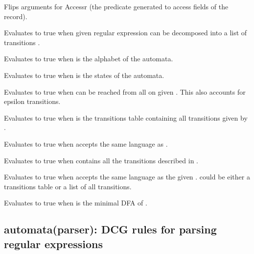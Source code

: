 \begin{description}
Flips arguments for Accessr (the predicate generated to access
fields of the record).

Evaluates to true when given regular expression  can be
decomposed into a list of transitions .

\begin{tags}
\end{tags}

Evaluates to true when  is the alphabet of the  automata.

Evaluates to true when  is the states of the  automata.

Evaluates to true when  can be reached from all 
on given . This also accounts for epsilon transitions.

Evaluates to true when  is the transitions table containing
all transitions given by .

Evaluates to true when  accepts the same language as .

Evaluates to true when  contains all the transitions
described in .

Evaluates to true when  accepts the same language as the
given .  could be either a transitions table or a list of
all transitions.

Evaluates to true when  is the minimal DFA of .
\end{description}

\subsection{automata(parser): DCG rules for parsing regular expressions}

\label{sec:parser}

